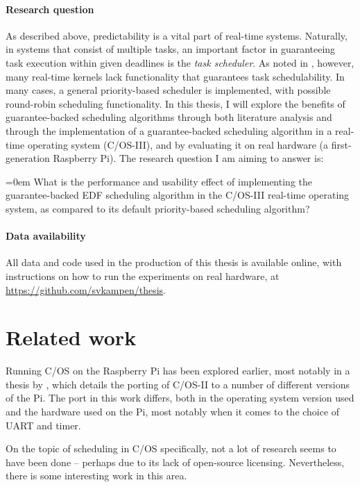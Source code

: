 \documentclass[twoside]{uva-inf-bachelor-thesis}
\newcommand{\ucosiii}{\textmu C/OS-III\xspace}
\newcommand{\ucosii}{\textmu C/OS-II\xspace}
\newcommand{\ucos}{\textmu C/OS\xspace}
\begin{document}
\subsubsection{Research question}
As described above, predictability is a vital part of real-time systems. Naturally, in systems that consist of multiple tasks, an important factor in guaranteeing task execution within given deadlines is the \textit{task scheduler}. As noted in \textcite{buttazzo2011hard}, however, many real-time kernels lack functionality that guarantees task schedulability. In many cases, a general priority-based scheduler is implemented, with possible round-robin scheduling functionality. In this thesis, I will explore the benefits of guarantee-backed scheduling algorithms through both literature analysis and through the implementation of a guarantee-backed scheduling algorithm in a real-time operating system (\ucosiii), and by evaluating it on real hardware (a first-generation Raspberry Pi). The research question I am aiming to answer is:

\begin{outline}
    \itemsep=0em
    \1 What is the performance and usability effect of implementing the guarantee-backed EDF scheduling algorithm in the \ucosiii real-time operating system, as compared to its default priority-based scheduling algorithm?
\end{outline}


\subsubsection{Data availability}
All data and code used in the production of this thesis is available online, with instructions on how to run the experiments on real hardware, at \url{https://github.com/svkampen/thesis}.



%
%
%
%

\chapter{Related work}
Running \ucos on the Raspberry Pi has been explored earlier, most notably in a thesis by \textcite{sfd:realpi}, which details the porting of \ucosii to a number of different versions of the Pi. The port in this work differs, both in the operating system version used and the hardware used on the Pi, most notably when it comes to the choice of UART and timer.

On the topic of scheduling in \ucos specifically, not a lot of research seems to have been done -- perhaps due to its lack of open-source licensing. Nevertheless, there is some interesting work in this area.
\end{document}
